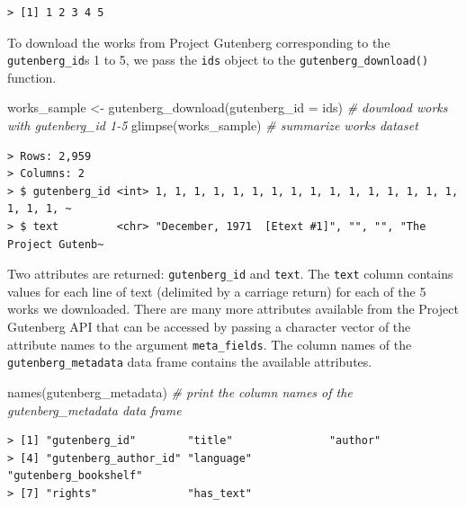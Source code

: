 \documentclass[
  letterpaper,
]{latex/krantz}
\newenvironment{Shaded}{\begin{snugshade}}{\end{snugshade}}
\newcommand{\AttributeTok}[1]{\textcolor[rgb]{0.00,0.00,0.00}{#1}}
\newcommand{\CommentTok}[1]{\textcolor[rgb]{0.00,0.00,0.00}{\textit{#1}}}
\newcommand{\FunctionTok}[1]{\textcolor[rgb]{0.00,0.00,0.00}{#1}}
\newcommand{\NormalTok}[1]{\textcolor[rgb]{0.00,0.00,0.00}{#1}}
\newcommand{\OtherTok}[1]{\textcolor[rgb]{0.00,0.00,0.00}{#1}}
\begin{document}
\begin{verbatim}
> [1] 1 2 3 4 5
\end{verbatim}

To download the works from Project Gutenberg corresponding to the
\texttt{gutenberg\_id}s 1 to 5, we pass the \texttt{ids} object to the
\texttt{gutenberg\_download()} function.

\begin{Shaded}
\begin{Highlighting}[]
\NormalTok{works\_sample }\OtherTok{\textless{}{-}} \FunctionTok{gutenberg\_download}\NormalTok{(}\AttributeTok{gutenberg\_id =}\NormalTok{ ids) }\CommentTok{\# download works with \textasciigrave{}gutenberg\_id\textasciigrave{} 1{-}5}
\FunctionTok{glimpse}\NormalTok{(works\_sample) }\CommentTok{\# summarize \textasciigrave{}works\textasciigrave{} dataset}
\end{Highlighting}
\end{Shaded}

\begin{verbatim}
> Rows: 2,959
> Columns: 2
> $ gutenberg_id <int> 1, 1, 1, 1, 1, 1, 1, 1, 1, 1, 1, 1, 1, 1, 1, 1, 1, 1, 1, ~
> $ text         <chr> "December, 1971  [Etext #1]", "", "", "The Project Gutenb~
\end{verbatim}

Two attributes are returned: \texttt{gutenberg\_id} and \texttt{text}.
The \texttt{text} column contains values for each line of text
(delimited by a carriage return) for each of the 5 works we downloaded.
There are many more attributes available from the Project Gutenberg API
that can be accessed by passing a character vector of the attribute
names to the argument \texttt{meta\_fields}. The column names of the
\texttt{gutenberg\_metadata} data frame contains the available
attributes.

\begin{Shaded}
\begin{Highlighting}[]
\FunctionTok{names}\NormalTok{(gutenberg\_metadata) }\CommentTok{\# print the column names of the \textasciigrave{}gutenberg\_metadata\textasciigrave{} data frame}
\end{Highlighting}
\end{Shaded}

\begin{verbatim}
> [1] "gutenberg_id"        "title"               "author"             
> [4] "gutenberg_author_id" "language"            "gutenberg_bookshelf"
> [7] "rights"              "has_text"
\end{verbatim}
\end{document}
